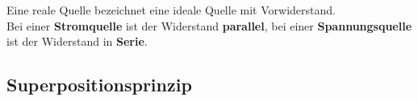 										\beginip
										Eine reale Quelle bezeichnet eine ideale Quelle mit Vorwiderstand. \\
										Bei einer \textbf{Stromquelle} ist der Widerstand \textbf{parallel}, bei einer \textbf{Spannungsquelle} ist der Widerstand in \textbf{Serie}.
											\begin{center}
												\fix
											\end{center}
										\iend




																				\subsection{Superpositionsprinzip}

